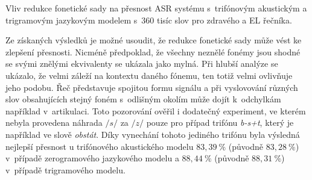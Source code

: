 \begin{table}[htpb]
  \centering
  \def\arraystretch{1.5}
  \caption[Vliv redukce na přesnost ASR s~trif. AM. a 3-gram LM (N=360k).]{Vliv redukce fonetické sady na přesnost ASR systému s~trifónovým akustickým a trigramovým jazykovým modelem s~360 tisíc slov pro zdravého a EL řečníka.}
  \label{tab:construction:reduction:04}
\end{table}



Ze získaných výsledků je možné usoudit, že redukce fonetické sady může vést ke zlepšení přesnosti.
Nicméně předpoklad, že všechny neznělé fonémy jsou shodné se svými znělými ekvivalenty se ukázala jako mylná.
Při hlubší analýze se ukázalo, že velmi záleží na kontextu daného fónemu, ten totiž velmi ovlivňuje jeho podobu.
Řeč představuje spojitou formu signálu a při vyslovování různých slov obsahujících stejný foném s~odlišným okolím  může dojít  k~odchylkám například v~artikulaci.
Toto pozorování ověřil i dodatečný experiment, ve kterém nebyla provedena náhrada $/s/$ za $/z/$ pouze pro případ trifónu \textit{b-s+t}, který je například ve slově \textit{obstát}.
Díky vynechání tohoto jediného trifónu byla výsledná nejlepší přesnost u trifónového akustického modelu $83,39~\%$ (původně $83,28~\%$) v~případě zerogramového jazykového modelu a $88,44~\%$ (původně $88,31~\%$) v~případě trigramového modelu.

